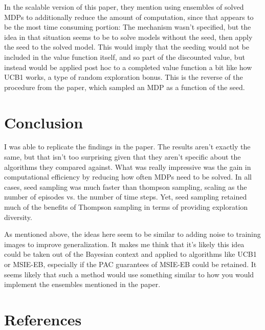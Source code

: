 \documentclass{article}
\begin{document}
In the scalable version of this paper,  they mention using ensembles of solved MDPs to additionally reduce the amount of computation, since that appears to be the most time consuming portion:  \cite{SCALSS} The mechanism wasn't specified, but the idea in that situation seems to be to solve models without the seed, then apply the seed to the solved model. This would imply that the seeding would not be included in the value function itself, and so part of the discounted value, but instead would be applied post hoc to a completed value function a bit like how UCB1 works, a type of random exploration bonus.  This is the reverse of the procedure from the \citep{SeedSampling} paper, which sampled an MDP as a function of the seed.  

\section{Conclusion}
I was able to replicate the findings in the paper. The results aren't exactly the same, but that isn't too surprising given that they aren't specific about the algorithms they compared against. What was really impressive was the gain in computational efficiency by reducing how often MDPs need to be solved. In all cases, seed sampling was much faster than thompson sampling, scaling as the number of episodes vs. the number of time steps. Yet, seed sampling retained much of the benefits of Thompson sampling in terms of providing exploration diversity.


As mentioned above, the ideas here seem to be similar to adding noise to training images to improve generalization. It makes me think that it's likely this idea could be taken out of the Bayesian context and applied to algorithms like UCB1 or MSIE-EB, especially if the PAC guarantees of MSIE-EB could be retained. It seems likely that such a method would use something similar to how you would implement the ensembles mentioned in the \cite{SCALSS} paper.

\section{References}



\end{document}

